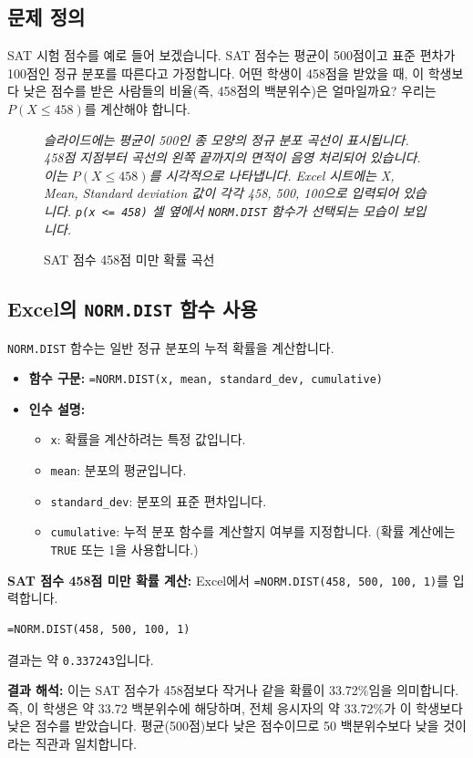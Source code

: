\documentclass[11pt,a4paper]{article}
\begin{document}
\subsection{문제 정의}
SAT 시험 점수를 예로 들어 보겠습니다. SAT 점수는 평균이 500점이고 표준 편차가 100점인 정규 분포를 따른다고 가정합니다.
어떤 학생이 458점을 받았을 때, 이 학생보다 낮은 점수를 받은 사람들의 비율(즉, 458점의 백분위수)은 얼마일까요?
우리는 $P(X \le 458)$를 계산해야 합니다.

\begin{figure}[h!]
    \centering
    \caption{SAT 점수 458점 미만 확률 곡선}
    \label{fig:sat_less_than}
    \vspace{0.5em}
    \textit{슬라이드에는 평균이 500인 종 모양의 정규 분포 곡선이 표시됩니다. 458점 지점부터 곡선의 왼쪽 끝까지의 면적이 음영 처리되어 있습니다. 이는 $P(X \le 458)$를 시각적으로 나타냅니다. Excel 시트에는 X, Mean, Standard deviation 값이 각각 458, 500, 100으로 입력되어 있습니다. \texttt{p(x <= 458)} 셀 옆에서 \texttt{NORM.DIST} 함수가 선택되는 모습이 보입니다.}
\end{figure}

\subsection{Excel의 \texttt{NORM.DIST} 함수 사용}
\texttt{NORM.DIST} 함수는 일반 정규 분포의 누적 확률을 계산합니다.

\begin{itemize}
    \item \textbf{함수 구문:} \texttt{=NORM.DIST(x, mean, standard\_dev, cumulative)}
    \item \textbf{인수 설명:}
    \begin{itemize}
        \item \texttt{x}: 확률을 계산하려는 특정 값입니다.
        \item \texttt{mean}: 분포의 평균입니다.
        \item \texttt{standard\_dev}: 분포의 표준 편차입니다.
        \item \texttt{cumulative}: 누적 분포 함수를 계산할지 여부를 지정합니다. (확률 계산에는 \texttt{TRUE} 또는 1을 사용합니다.)
    \end{itemize}
\end{itemize}

\begin{examplebox}
    \textbf{SAT 점수 458점 미만 확률 계산:}
    Excel에서 \texttt{=NORM.DIST(458, 500, 100, 1)}를 입력합니다.
    \begin{lstlisting}[language=Excel, caption={Excel에서 '미만' 확률 계산 예시}, label={lst:norm_dist_less_than}]
=NORM.DIST(458, 500, 100, 1)
    \end{lstlisting}
    결과는 약 \texttt{0.337243}입니다.

    \textbf{결과 해석:}
    이는 SAT 점수가 458점보다 작거나 같을 확률이 33.72\%임을 의미합니다.
    즉, 이 학생은 약 33.72 백분위수에 해당하며, 전체 응시자의 약 33.72\%가 이 학생보다 낮은 점수를 받았습니다.
    평균(500점)보다 낮은 점수이므로 50 백분위수보다 낮을 것이라는 직관과 일치합니다.
\end{examplebox}
\end{document}
